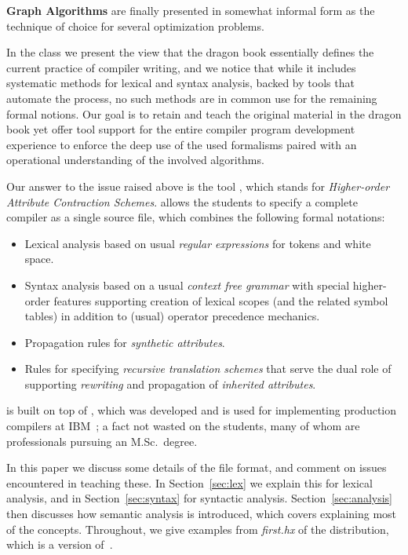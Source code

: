 \documentclass{article}
\begin{document}
\smallskip\noindent\textbf{Graph Algorithms} are finally presented in somewhat informal form as the technique of choice
  for several optimization problems.


In the class we present the view that the dragon book essentially defines the current practice of
compiler writing, and we notice that while it includes systematic methods for lexical and syntax
analysis, backed by tools that automate the process, no such methods are in common use for the
remaining formal notions.  Our goal is to retain and teach the original material in the dragon book
yet offer tool support for the entire compiler program development experience to enforce the deep
use of the used formalisms paired with an operational understanding of the involved algorithms.

Our answer to the issue raised above is the tool \HAX, which stands for \emph{Higher-order Attribute
  Contraction Schemes}.  \HAX allows the students to specify a complete compiler as a single source
file, which combines the following formal notations:
\begin{itemize}

\item Lexical analysis based on usual \emph{regular expressions} for tokens and white space.

\item Syntax analysis based on a usual \emph{context free grammar} with special higher-order
  features supporting creation of lexical scopes (and the related symbol tables) in addition to
  (usual) operator precedence mechanics.

\item Propagation rules for \emph{synthetic attributes}.

\item Rules for specifying \emph{recursive translation schemes} that serve the dual role of
  supporting \emph{rewriting} and propagation of \emph{inherited attributes}.

\end{itemize}
\HAX is built on top of \CRSX, which was developed and is used for implementing production compilers
at IBM~\cite{Rose:hor2007,rose:hor2010,Rose:rta2011}; a fact not wasted on the students, many of
whom are professionals pursuing an M.Sc.\ degree.

In this paper we discuss some details of the \HAX file format, and comment on issues encountered in
teaching these.
In Section~\ref{sec:lex} we explain this for lexical analysis, and in Section~\ref{sec:syntax} for
syntactic analysis.
Section~\ref{sec:analysis} then discusses how semantic analysis is introduced, which covers
explaining most of the \HAX concepts.
Throughout, we give examples from \emph{first.hx} of the \HAX distribution, which is a \HAX version
of~\cite[Chapter 2, Figure 7]{Aho+:2006}.
\end{document}

